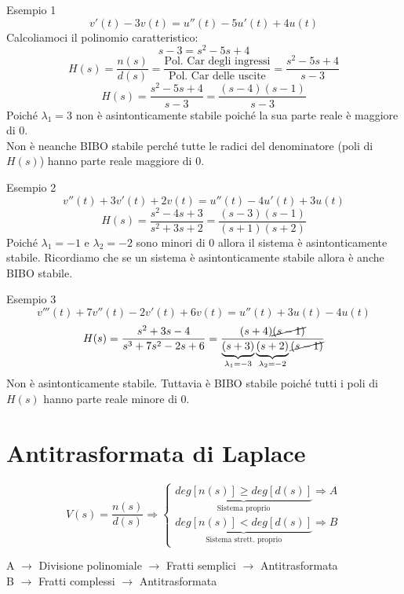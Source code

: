 \documentclass[a4paper]{article}
\begin{document}
\begin{examplebox}{Esempio 1}
    \[v'(t) - 3v(t) = u''(t) - 5u'(t) + 4u(t)\]
    Calcoliamoci il polinomio caratteristico:
    \[s - 3 = s^2 - 5s + 4\]
    \[H(s) = \frac{n(s)}{d(s)} = \frac{\text{Pol. Car degli ingressi}}{\text{Pol. Car delle uscite}} = \frac{s^2 -5s + 4}{s - 3}\]
    \[H(s) = \frac{s^2 - 5s + 4}{s - 3} = \frac{(s-4)(s-1)}{s-3}\]
    Poiché $\lambda_1 = 3$ non è asintonticamente stabile poiché la sua parte reale è maggiore di 0.\\ Non è neanche BIBO stabile
    perché tutte le radici del denominatore (poli di $H(s)$) hanno parte reale maggiore di 0.
\end{examplebox}
\begin{examplebox}{Esempio 2}
    \[v''(t) + 3v'(t) + 2v(t) = u''(t) - 4u'(t) + 3u(t)\]
    \[H(s) = \frac{s^2 - 4s + 3}{s^2 + 3s + 2} = \frac{(s-3)(s-1)}{(s+1)(s+2)}\]
    Poiché $\lambda_1 = -1$ e $\lambda_2 = -2$ sono minori di 0 allora il sistema è asintonticamente stabile. Ricordiamo che se un sistema è 
    asintonticamente stabile allora è anche BIBO stabile.
\end{examplebox}
 \begin{examplebox}{Esempio 3}
    \[v'''(t) + 7v''(t) - 2v'(t) + 6v(t) = u''(t) + 3u(t) - 4u(t)\]
    \[H(s) = \frac{s^2 + 3s - 4}{s^3 + 7s^2 - 2s + 6} = \frac{(s+4)\cancel{(s-1)}}{\underbrace{(s+3)}_{\lambda_1 = -3}\underbrace{(s+2)}_{\lambda_2 = -2}\cancel{(s-1)}}\]
    Non è asintonticamente stabile. Tuttavia è BIBO stabile poiché tutti i poli di $H(s)$ hanno parte reale minore di 0.
 \end{examplebox}

\section{Antitrasformata di Laplace}

\[V(s) = \frac{n(s)}{d(s)} \Longrightarrow \begin{cases}
    \underbrace{deg[n(s)] \ge deg[d(s)]}_{\text{Sistema proprio}} \Longrightarrow A\\
    \underbrace{deg[n(s)] < deg[d(s)]}_{\text{Sistema strett. proprio}} \Longrightarrow B
\end{cases}\]

\begin{center}
    A $\rightarrow$ Divisione polinomiale $\rightarrow$ Fratti semplici $\rightarrow$ Antitrasformata\\
    B $\rightarrow$ Fratti complessi $\rightarrow$ Antitrasformata
\end{center}
\end{document}
